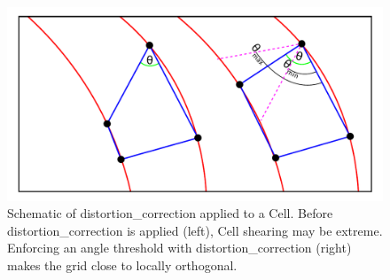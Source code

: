 


\begin{figure}[H]
    \centering
    \includegraphics[width=\linewidth]{figures/cell_shearing_diagram.pdf}
    \caption{Schematic of distortion\_correction applied to a Cell. Before distortion\_correction is applied (left), Cell shearing may be extreme. Enforcing an angle threshold with distortion\_correction (right) makes the grid close to locally orthogonal.}
    \label{fig:cell_shearing}
\end{figure}

